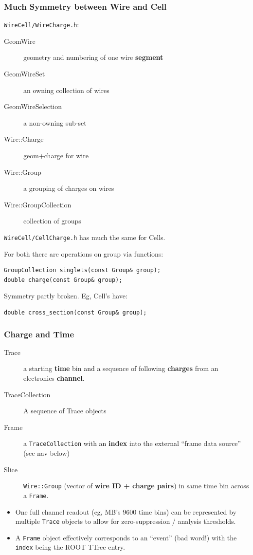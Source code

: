 \documentclass[xcolor=dvipsnames]{beamer}
\begin{document}
\begin{frame}[fragile]
  \frametitle{Much Symmetry between Wire and Cell}
  \footnotesize
  \texttt{WireCell/WireCharge.h}:
  \begin{description}
  \item[GeomWire] geometry and numbering of one wire \textbf{segment}
  \item[GeomWireSet] an owning collection of wires
  \item[GeomWireSelection] a non-owning sub-set
  \item[Wire::Charge] geom+charge for wire
  \item[Wire::Group] a grouping of charges on wires
  \item[Wire::GroupCollection] collection of groups
  \end{description}
  \texttt{WireCell/CellCharge.h} has much the same for Cells.

  \vspace{2mm}
  For both there are operations on group via functions:
  \begin{lstlisting}
GroupCollection singlets(const Group& group);
double charge(const Group& group);
  \end{lstlisting}
  Symmetry partly broken.  Eg, Cell's have:
  \begin{lstlisting}
double cross_section(const Group& group);
  \end{lstlisting}
\end{frame}

\begin{frame}
  \frametitle{Charge and Time}
  \begin{description}
  \item[Trace] a starting \textbf{time} bin and a sequence of following \textbf{charges}
    from an electronics \textbf{channel}.
  \item[TraceCollection] A sequence of Trace objects
  \item[Frame] a \texttt{TraceCollection} with an \textbf{index} into the external
    ``frame data source'' (see nav below)
  \item[Slice] \texttt{Wire::Group} (vector of \textbf{wire ID + charge pairs})
    in same time bin across a \texttt{Frame}.
  \end{description}

  \footnotesize
  \begin{itemize}
  \item One full channel readout (eg, MB's 9600 time bins) can be
    represented by multiple \texttt{Trace} objects to allow for
    zero-suppression / analysis thresholds.
  \item A \texttt{Frame} object effectively corresponds to an ``event''
    (bad word!) with the \texttt{index} being the ROOT TTree entry.
  \end{itemize}
\end{frame}
\end{document}
